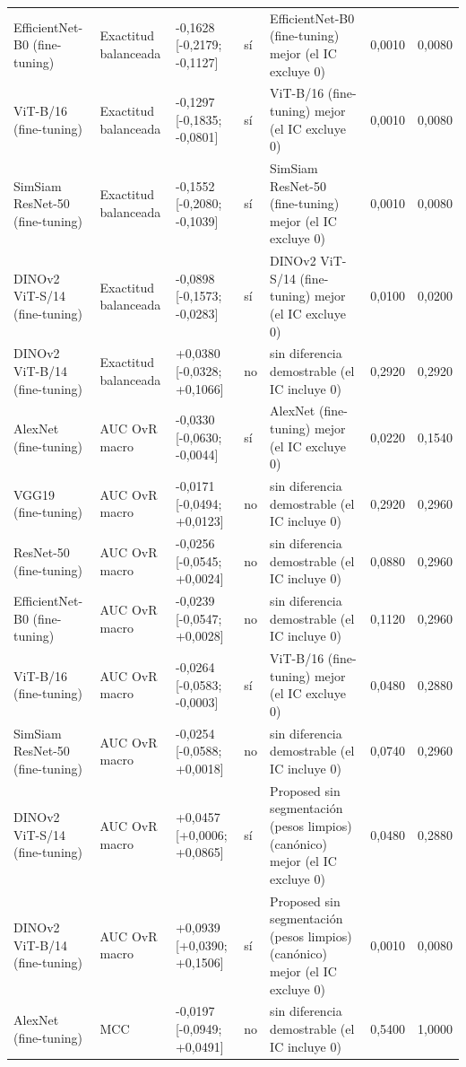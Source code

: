 \begin{longtable}{@{}lllllll@{}}
EfficientNet-B0 (fine-tuning) & Exactitud balanceada & -0,1628 [-0,2179; -0,1127] & sí & EfficientNet-B0 (fine-tuning) mejor (el IC excluye 0) & 0,0010 & 0,0080 \\
ViT-B/16 (fine-tuning) & Exactitud balanceada & -0,1297 [-0,1835; -0,0801] & sí & ViT-B/16 (fine-tuning) mejor (el IC excluye 0) & 0,0010 & 0,0080 \\
SimSiam ResNet-50 (fine-tuning) & Exactitud balanceada & -0,1552 [-0,2080; -0,1039] & sí & SimSiam ResNet-50 (fine-tuning) mejor (el IC excluye 0) & 0,0010 & 0,0080 \\
DINOv2 ViT-S/14 (fine-tuning) & Exactitud balanceada & -0,0898 [-0,1573; -0,0283] & sí & DINOv2 ViT-S/14 (fine-tuning) mejor (el IC excluye 0) & 0,0100 & 0,0200 \\
DINOv2 ViT-B/14 (fine-tuning) & Exactitud balanceada & +0,0380 [-0,0328; +0,1066] & no & sin diferencia demostrable (el IC incluye 0) & 0,2920 & 0,2920 \\
AlexNet (fine-tuning) & AUC OvR macro & -0,0330 [-0,0630; -0,0044] & sí & AlexNet (fine-tuning) mejor (el IC excluye 0) & 0,0220 & 0,1540 \\
VGG19 (fine-tuning) & AUC OvR macro & -0,0171 [-0,0494; +0,0123] & no & sin diferencia demostrable (el IC incluye 0) & 0,2920 & 0,2960 \\
ResNet-50 (fine-tuning) & AUC OvR macro & -0,0256 [-0,0545; +0,0024] & no & sin diferencia demostrable (el IC incluye 0) & 0,0880 & 0,2960 \\
EfficientNet-B0 (fine-tuning) & AUC OvR macro & -0,0239 [-0,0547; +0,0028] & no & sin diferencia demostrable (el IC incluye 0) & 0,1120 & 0,2960 \\
ViT-B/16 (fine-tuning) & AUC OvR macro & -0,0264 [-0,0583; -0,0003] & sí & ViT-B/16 (fine-tuning) mejor (el IC excluye 0) & 0,0480 & 0,2880 \\
SimSiam ResNet-50 (fine-tuning) & AUC OvR macro & -0,0254 [-0,0588; +0,0018] & no & sin diferencia demostrable (el IC incluye 0) & 0,0740 & 0,2960 \\
DINOv2 ViT-S/14 (fine-tuning) & AUC OvR macro & +0,0457 [+0,0006; +0,0865] & sí & Proposed sin segmentación (pesos limpios) (canónico) mejor (el IC excluye 0) & 0,0480 & 0,2880 \\
DINOv2 ViT-B/14 (fine-tuning) & AUC OvR macro & +0,0939 [+0,0390; +0,1506] & sí & Proposed sin segmentación (pesos limpios) (canónico) mejor (el IC excluye 0) & 0,0010 & 0,0080 \\
AlexNet (fine-tuning) & MCC & -0,0197 [-0,0949; +0,0491] & no & sin diferencia demostrable (el IC incluye 0) & 0,5400 & 1,0000 \\

\end{longtable}
